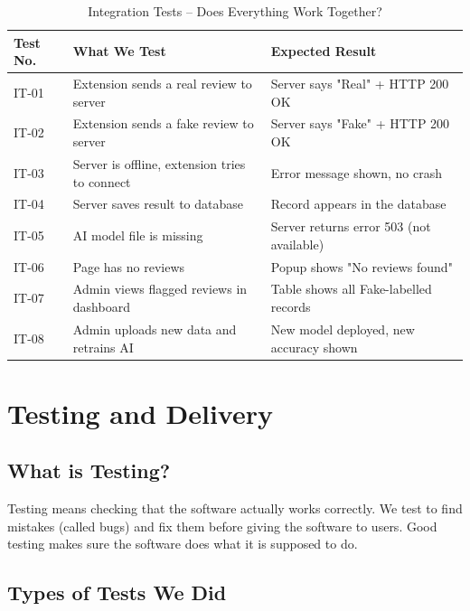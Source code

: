 \documentclass[10pt, a4paper]{report}
\begin{document}
\begin{table}[H]
\centering
\caption{Integration Tests -- Does Everything Work Together?}
\begin{tabularx}{\textwidth}{lXl}
\toprule
\textbf{Test No.} & \textbf{What We Test} & \textbf{Expected Result} \\
\midrule
IT-01 & Extension sends a real review to server & Server says "Real" + HTTP 200 OK \\
IT-02 & Extension sends a fake review to server & Server says "Fake" + HTTP 200 OK \\
IT-03 & Server is offline, extension tries to connect & Error message shown, no crash \\
IT-04 & Server saves result to database & Record appears in the database \\
IT-05 & AI model file is missing & Server returns error 503 (not available) \\
IT-06 & Page has no reviews & Popup shows "No reviews found" \\
IT-07 & Admin views flagged reviews in dashboard & Table shows all Fake-labelled records \\
IT-08 & Admin uploads new data and retrains AI & New model deployed, new accuracy shown \\
\bottomrule
\end{tabularx}
\end{table}

\chapter{Testing and Delivery}

\section{What is Testing?}

Testing means checking that the software actually works correctly. We test to find mistakes (called bugs) and fix them before giving the software to users. Good testing makes sure the software does what it is supposed to do.

\section{Types of Tests We Did}
\end{document}
